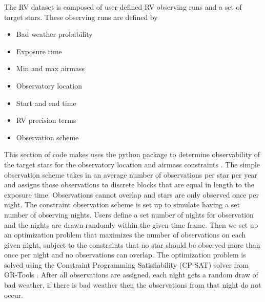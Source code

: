 The RV dataset is composed of user-defined RV observing runs and a set of
target stars. These observing runs are defined by
\begin{itemize}
  \item Bad weather probability
  \item Exposure time
  \item Min and max airmass
  \item Observatory location
  \item Start and end time
  \item RV precision terms
  \item Observation scheme
\end{itemize}
This section of code makes uses the  python package to determine
observability of the target stars for the observatory location and airmass
constraints \citep{morrisAstroplanOpen2018}. The simple observation scheme takes in an average number of
observations per star per year and assigns those observations to discrete
blocks that are equal in length to the exposure time. Observations cannot
overlap and stars are only observed once per night. The constraint observation
scheme is set up to simulate having a set number of observing nights. Users
define a set number of nights for observation and the nights are drawn randomly
within the given time frame. Then we set up an optimization problem that
maximizes the number of observations on each given night, subject to the
constraints that no star should be observed more than once per night and no
observations can overlap. The optimization problem is solved using the
Constraint Programming Satisfiability (CP-SAT) solver from OR-Tools \citep{perronORTools2022}.
After all observations are assigned, each night gets a random draw of bad
weather, if there is bad weather then the observations from that night do not
occur. 

